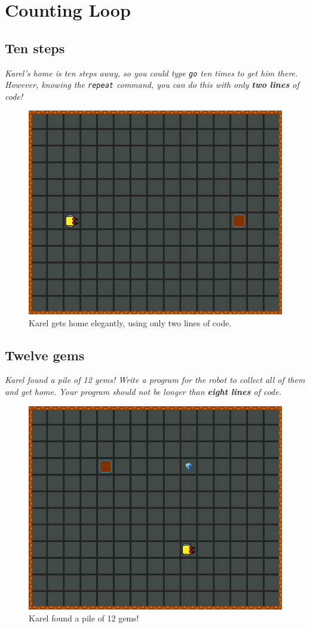 {{%

\setcounter{section}{4}
\section{Counting Loop}

\subsection{Ten steps}

{\em Karel's home is ten steps away, so you could type {\tt go} ten times to get him there. 
However, knowing the {\tt repeat} command, you can do this with only {\bf two lines} of code!}

\begin{figure}[!ht]
\begin{center}
\includegraphics[height=0.4\textwidth]{img/c01.png}
\end{center}
\vspace{-4mm}
\caption{Karel gets home elegantly, using only two lines of code.}
\label{fig:c01}
\vspace{-1cm}
\end{figure}
\newpage


\subsection{Twelve gems}

{\em Karel found a pile of 12 gems! Write a program for the robot to collect all of them and get home. Your program should not be longer than {\bf eight lines} of code.}

\begin{figure}[!ht]
\begin{center}
\includegraphics[height=0.4\textwidth]{img/c02.png}
\end{center}
\vspace{-4mm}
\caption{Karel found a pile of 12 gems!}
\label{fig:c02}
\vspace{-10mm}
\end{figure}
\noindent



}}
